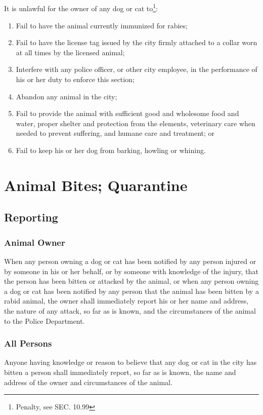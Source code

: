 \subsection{}
It is unlawful for the owner of any dog or cat to\footnote{Penalty, see SEC. 10.99}:
\begin{enumerate}[{\indent}1)]
    \item Fail to have the animal currently immunized for rabies;
    \item Fail to have the license tag issued by the city firmly attached to a collar worn at all times by the licensed animal;
    \item Interfere with any police officer, or other city employee, in the performance of his or her duty to enforce this section;
    \item Abandon any animal in the city;
    \item Fail to provide the animal with sufficient good and wholesome food and water, proper shelter and protection from the elements, veterinary care when needed to prevent suffering, and humane care and treatment; or 
    \item Fail to keep his or her dog from barking, howling or whining.
\end{enumerate}

\section{Animal Bites; Quarantine}
\subsection{Reporting}
\subsubsection{Animal Owner}
When any person owning a dog or cat has been notified by any person injured or by someone in his or her behalf, or by someone with knowledge of the injury, that the person has been bitten or attacked by the animal, or when any person owning a dog or cat has been notified by any person that the animal has been bitten by a rabid animal, the owner shall immediately report his or her name and address, the nature of any attack, so far as is known, and the circumstances of the animal to the Police Department.
\subsubsection{All Persons}
Anyone having knowledge or reason to believe that any dog or cat in the city has bitten a person shall immediately report, so far as is known, the name and address of the owner and circumstances of the animal.
